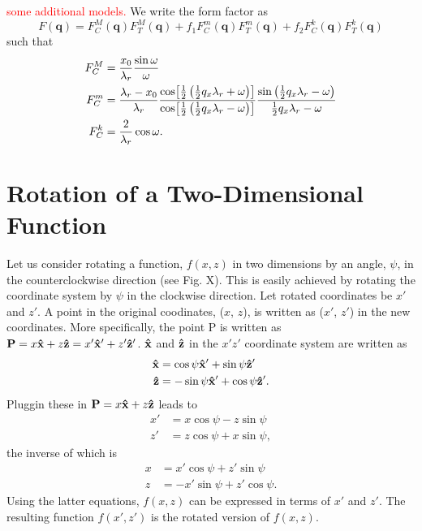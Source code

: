 \textcolor{red}{some additional models.} We write the form factor as
\begin{equation}
  F(\mathbf{q}) = F_C^M(\mathbf{q})F_T^M(\mathbf{q}) 
  + f_1F_C^m(\mathbf{q})F_T^m(\mathbf{q}) 
  + f_2F_C^k(\mathbf{q})F_T^k(\mathbf{q})
\end{equation}
such that
\begin{align}
  F_C^M &= \frac{x_0}{\lambda_r}\frac{\sin\omega}{\omega} \\
  F_C^m &= \frac{\lambda_r-x_0}{\lambda_r}
  \frac{\cos\mathopen{}\left[ \frac{1}{2}\left(\frac{1}{2}q_x\lambda_r + \omega\right) \right]\mathclose{}}
       {\cos\mathopen{}\left[ \frac{1}{2}\left(\frac{1}{2}q_x\lambda_r - \omega\right) \right]\mathclose{}}
  \frac{\sin\left(\frac{1}{2}q_x\lambda_r - \omega\right)}
       {\frac{1}{2}q_x\lambda_r - \omega} \\
  F_C^k &= \frac{2}{\lambda_r}\cos\omega.
  \label{eq:FC_split}
\end{align}

\newpage
\section{Rotation of a Two-Dimensional Function}
Let us consider rotating a function, $f(x,z)$ in two dimensions by an angle, 
$\psi$, in the counterclockwise direction (see Fig. X). This is easily 
achieved by rotating the coordinate system by $\psi$ in the clockwise direction. 
Let rotated coordinates be $x'$ and $z'$. A point in the original coodinates,
($x$, $z$), is written as ($x'$, $z'$) in the new coordinates. More specifically,
the point P is written as 
$\mathbf{P}=x\mathbf{\hat{x}}+z\mathbf{\hat{z}}=x'\mathbf{\hat{x}}'+z'\mathbf{\hat{z}}'$. $\mathbf{\hat{x}}$ and $\mathbf{\hat{z}}$ in
the $x'z'$ coordinate system are written as 
\begin{align}
  \mathbf{\hat{x}} &= \cos\psi\mathbf{\hat{x}}'+\sin\psi\mathbf{\hat{z}}' \\
  \mathbf{\hat{z}} &= -\sin\psi\mathbf{\hat{x}}'+\cos\psi\mathbf{\hat{z}}'.
\end{align}
Pluggin these in $\mathbf{P}=x\mathbf{\hat{x}}+z\mathbf{\hat{z}}$ leads to
\begin{align}
  x' &= x\cos\psi - z\sin\psi \\
  z' &= z\cos\psi + x\sin\psi,
\end{align}
the inverse of which is
\begin{align}
  x &= x'\cos\psi + z'\sin\psi \\
  z &= -x'\sin\psi + z'\cos\psi.
\end{align}
Using the latter equations, $f(x,z)$ can be expressed in terms of $x'$ and $z'$. 
The resulting function $f(x',z')$ is the rotated version of $f(x,z)$. 

